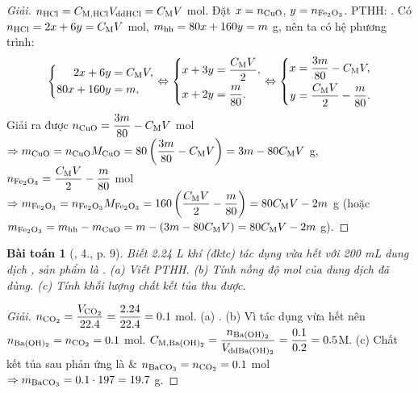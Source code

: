 \documentclass{article}
\newtheorem{baitoan}{Bài toán}
\begin{document}
\begin{proof}[Giải]
	$n_{\rm HCl} = C_{\rm M,HCl}V_{\rm ddHCl} = C_{\rm M}V$ mol. Đặt $x = n_{\rm CuO}$, $y = n_{\ce{Fe2O3}}$. PTHH: . Có $n_{\rm HCl} = 2x + 6y = C_{\rm M}V$ mol, $m_{\rm hh} = 80x + 160y = m$ g, nên ta có hệ phương trình:
	\begin{equation*}
		\left\{\begin{split}
			2x + 6y &= C_{\rm M}V,\\
			80x + 160y &= m,
		\end{split}\right.\Leftrightarrow\left\{\begin{split}
			x + 3y &= \frac{C_{\rm M}V}{2},\\
			x + 2y &= \frac{m}{80}.
		\end{split}\right.\Leftrightarrow\left\{\begin{split}
			x &= \frac{3m}{80} - C_{\rm M}V,\\
			y &= \frac{C_{\rm M}V}{2} - \frac{m}{80}.
		\end{split}\right.
	\end{equation*}
	Giải ra được $n_{\rm CuO} = \dfrac{3m}{80} - C_{\rm M}V$ mol $\Rightarrow m_{\rm CuO} = n_{\rm CuO}M_{\rm CuO} = 80\left(\dfrac{3m}{80} - C_{\rm M}V\right) = 3m - 80C_{\rm M}V$ g, $n_{\ce{Fe2O3}} = \dfrac{C_{\rm M}V}{2} - \dfrac{m}{80}$ mol $\Rightarrow m_{\ce{Fe2O3}} = n_{\ce{Fe2O3}}M_{\ce{Fe2O3}} = 160\left(\dfrac{C_{\rm M}V}{2} - \dfrac{m}{80}\right) = 80C_{\rm M}V - 2m$ g (hoặc $m_{\ce{Fe2O3}} = m_{\rm hh} - m_{\rm CuO} = m - (3m - 80C_{\rm M}V) = 80C_{\rm M}V - 2m$ g).
\end{proof}

\begin{baitoan}[\cite{SGK_Hoa_Hoc_9}, 4., p. 9]
	Biết {\rm2.24 L} khí {\rm{}} (đktc) tác dụng vừa hết với {\rm200 mL} dung dịch {\rm{}}, sản phẩm là {\rm{}}. (a) Viết PTHH. (b) Tính nồng độ mol của dung dịch {\rm{}} đã dùng. (c) Tính khối lượng chất kết tủa thu được.
\end{baitoan}

\begin{proof}[Giải]
	$n_{\ce{CO2}} = \dfrac{V_{\ce{CO2}}}{22.4} = \dfrac{2.24}{22.4} = 0.1$ mol. (a) . (b) Vì  tác dụng vừa hết nên $n_{\ce{Ba(OH)2}} = n_{\ce{CO2}} = 0.1$ mol. $C_{\rm M,\ce{Ba(OH)2}} = \dfrac{n_{\ce{Ba(OH)2}}}{V_{\rm dd\ce{Ba(OH)2}}} = \dfrac{0.1}{0.2} = 0.5$M. (c) Chất kết tủa sau phản ứng là  \& $n_{\ce{BaCO3}} = n_{\ce{CO2}} = 0.1$ mol $\Rightarrow m_{\ce{BaCO3}} = 0.1\cdot197 = 19.7$ g.
\end{proof}
\end{document}
